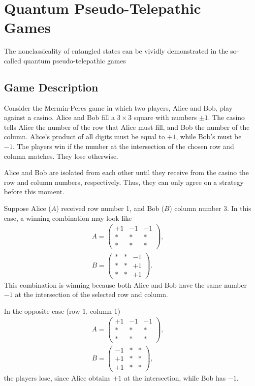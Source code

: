 \section{Quantum Pseudo-Telepathic Games}

The nonclassicality of entangled states can be vividly
demonstrated in the so-called quantum pseudo-telepathic games
\cite{bPseudoTelepathy2003,bPseudoTelepathy2004}

\subsection{Game Description}
Consider the Mermin-Peres game in which two players,
Alice and Bob, play against a casino. 
Alice and Bob fill a $3 \times 3$ square with numbers $\pm 1$.
The casino tells Alice the number of the row that Alice must fill, and
Bob the number of the column. Alice's product of all digits must be
equal to $+1$, while Bob's must be $-1$. The players win if the number
at the intersection of the chosen row and column matches. They lose otherwise.

Alice and Bob are isolated from each other until they receive
from the casino the row and column numbers, respectively. Thus, they can
only agree on a strategy before this moment.

\begin{example}
Suppose Alice ($A$) received row number 1, and Bob ($B$) column number 3. In this case, a winning combination may look like  
\begin{eqnarray}
A = \left(
\begin{array}{ccc}
+1 & -1 & -1 \\
\ast & \ast & \ast \\
\ast & \ast & \ast  
\end{array}
\right),
\nonumber \\
B = \left(
\begin{array}{ccc}
\ast & \ast & -1 \\
\ast & \ast & +1 \\
\ast & \ast & +1  
\end{array}
\right).
\nonumber 
\end{eqnarray}
This combination is winning because both Alice and Bob have the same number $-1$ 
at the intersection of the selected row and column.


In the opposite case (row 1, column 1) 
\begin{eqnarray}
A = \left(
\begin{array}{ccc}
+1 & -1 & -1 \\
\ast & \ast & \ast \\
\ast & \ast & \ast  
\end{array}
\right),
\nonumber \\
B = \left(
\begin{array}{ccc}
-1 & \ast & \ast \\
+1 & \ast & \ast \\
+1 & \ast & \ast  
\end{array}
\right),
\nonumber 
\end{eqnarray}
the players lose, since Alice obtains $+1$ at the intersection, while Bob has $-1$. 
\end{example}


